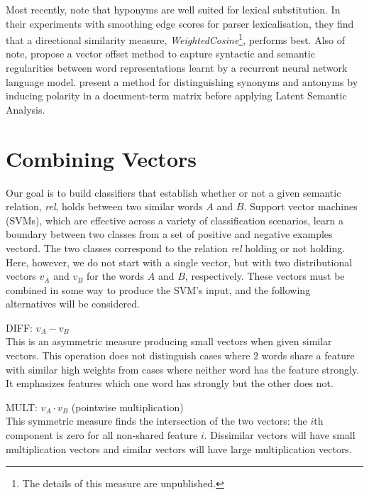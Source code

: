 \documentclass[11pt]{article}
\begin{document}
Most recently,  note that hyponyms are well suited for lexical substitution.  In their experiments with smoothing edge scores for parser lexicalisation, they find that a directional similarity measure,  \emph{WeightedCosine}\footnote{The details of this measure are unpublished.}, performs best. Also of note,  propose a vector offset method to capture syntactic and semantic regularities between word representations learnt by a recurrent neural network language model.   present a method for distinguishing synonyms and antonyms by inducing polarity in a document-term matrix before applying Latent Semantic Analysis.

\section{Combining Vectors}
\label{sect:theory}
Our goal is to build classifiers that establish whether or not a given semantic relation, \emph{rel}, holds between two similar words $A$ and $B$.
Support vector machines (SVMs), which are effective across a variety of classification scenarios, learn a boundary between two classes from a set of positive and negative examples vectord.  The two classes correspond to the relation \emph{rel} holding or not holding.  Here, however, we do not start with a single vector, but with two distributional vectors $v_A$ and $v_B$ for the words $A$ and $B$, respectively. These vectors must be combined in some way to produce the SVM's input, and the following alternatives will be considered.

\smallskip

\noindent DIFF: $v_A - v_B$\\[2pt]
This is an asymmetric measure producing small vectors when given similar vectors. This operation does not distinguish  cases where $2$ words share a feature with similar high weights from cases where neither word has the feature strongly.  It emphasizes features which one word has strongly but the other does not.

\smallskip

\noindent MULT: $v_A\cdot v_B$ (pointwise multiplication)\\[2pt]
This  symmetric measure finds the intersection of the two vectors: the $i$th component is zero for all non-shared feature $i$.   Dissimilar vectors will have small multiplication vectors and similar vectors will have large multiplication vectors.  
\smallskip
\end{document}

